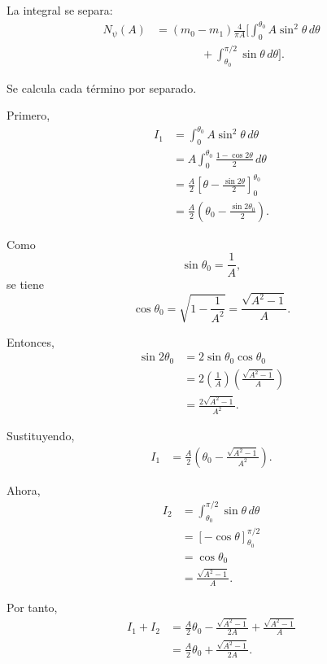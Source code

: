 \documentclass[journal]{IEEEtran}
\begin{document}
La integral se separa:
\begin{align}
N_\psi(A)
&=
(m_0-m_1)
\frac{4}{\pi A}
\biggl[
\int_0^{\theta_0}
A\sin^2\theta\,d\theta \nonumber\\
&\qquad\qquad+
\int_{\theta_0}^{\pi/2}
\sin\theta\,d\theta
\biggr].
\end{align}

Se calcula cada término por separado.

Primero,
\begin{align}
I_1
&=
\int_0^{\theta_0}
A\sin^2\theta\,d\theta
\\
&=
A
\int_0^{\theta_0}
\frac{1-\cos 2\theta}{2}\,d\theta
\\
&=
\frac{A}{2}
\left[
\theta-\frac{\sin 2\theta}{2}
\right]_0^{\theta_0}
\\
&=
\frac{A}{2}
\left(
\theta_0-\frac{\sin 2\theta_0}{2}
\right).
\end{align}

Como
\begin{equation}
\sin\theta_0=\frac1A,
\end{equation}
se tiene
\begin{equation}
\cos\theta_0
=
\sqrt{1-\frac1{A^2}}
=
\frac{\sqrt{A^2-1}}{A}.
\end{equation}

Entonces,
\begin{align}
\sin 2\theta_0
&=
2\sin\theta_0\cos\theta_0
\\
&=
2
\left(\frac1A\right)
\left(\frac{\sqrt{A^2-1}}{A}\right)
\\
&=
\frac{2\sqrt{A^2-1}}{A^2}.
\end{align}

Sustituyendo,
\begin{align}
I_1
&=
\frac{A}{2}
\left(
\theta_0
-
\frac{\sqrt{A^2-1}}{A^2}
\right).
\end{align}

Ahora,
\begin{align}
I_2
&=
\int_{\theta_0}^{\pi/2}\sin\theta\,d\theta
\\
&=
\left[
-\cos\theta
\right]_{\theta_0}^{\pi/2}
\\
&=
\cos\theta_0
\\
&=
\frac{\sqrt{A^2-1}}{A}.
\end{align}

Por tanto,
\begin{align}
I_1+I_2
&=
\frac{A}{2}\theta_0
-
\frac{\sqrt{A^2-1}}{2A}
+
\frac{\sqrt{A^2-1}}{A}
\\
&=
\frac{A}{2}\theta_0
+
\frac{\sqrt{A^2-1}}{2A}.
\end{align}
\end{document}
